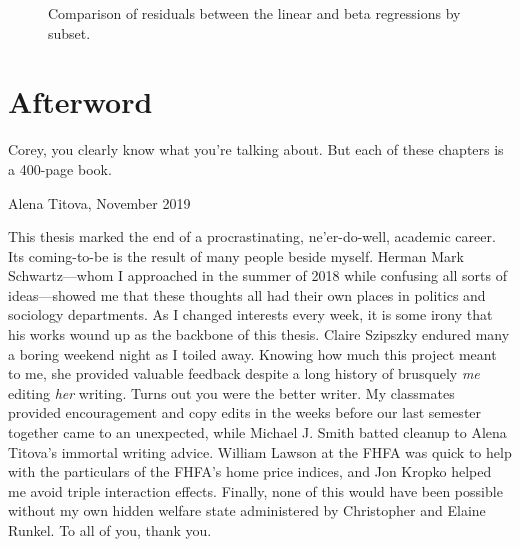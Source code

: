 \documentclass[12pt,oneside]{psthesis}
\begin{document}
\begin{figure}

{\centering {}\newline{}

}

\caption{Comparison of residuals between the linear and beta regressions by subset.}\label{fig:resids}
\end{figure}

\hypertarget{afterword}{%
\chapter*{Afterword}\label{afterword}}

\epigraph{Corey, you clearly know what you're talking about. But each of these chapters is a 400-page book.}{Alena Titova, November 2019}

This thesis marked the end of a procrastinating, ne'er-do-well, academic career.
Its coming-to-be is the result of many people beside myself.
Herman Mark Schwartz---whom I approached in the summer of 2018 while confusing all sorts of ideas---showed me that these thoughts all had their own places in politics and sociology departments.
As I changed interests every week, it is some irony that his works wound up as the backbone of this thesis.
Claire Szipszky endured many a boring weekend night as I toiled away.
Knowing how much this project meant to me, she provided valuable feedback despite a long history of brusquely \emph{me} editing \emph{her} writing.
Turns out you were the better writer.
My classmates provided encouragement and copy edits in the weeks before our last semester together came to an unexpected, while Michael J. Smith batted cleanup to Alena Titova's immortal writing advice.
William Lawson at the FHFA was quick to help with the particulars of the FHFA's home price indices, and Jon Kropko helped me avoid triple interaction effects.
Finally, none of this would have been possible without my own hidden welfare state administered by Christopher and Elaine Runkel.
To all of you, thank you.
\end{document}
